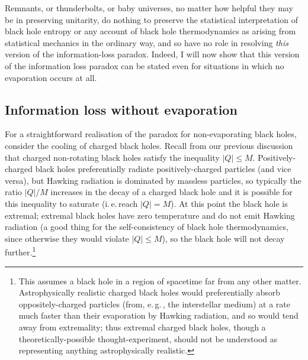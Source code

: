 \documentclass{article}
\newcommand{\iec}{\mbox{i.\,e.\,}}
\newcommand{\egc}{\mbox{e.\,g.\,}}
\begin{document}
Remnants, or thunderbolts,  or baby universes, no matter how helpful they may be in preserving unitarity, do nothing to preserve the statistical interpretation of black hole entropy or any account of black hole thermodynamics as arising from statistical mechanics in the ordinary way, and so have no role in resolving \emph{this} version of the information-loss paradox. Indeed, I will now show that this version of the information loss paradox can be stated even for situations in which no evaporation occurs at all.

\subsection{Information loss without evaporation}\label{infoparadox-noevap}

For a straightforward realisation of the paradox for non-evaporating black holes, consider the cooling of charged black holes. Recall from our previous discussion that charged non-rotating black holes satisfy the inequality $|Q|\leq M$. Positively-charged black holes preferentially radiate positively-charged particles (and vice versa), but Hawking radiation is dominated by massless particles, so typically the ratio $|Q|/M$ increases in the decay of a charged black hole and it is possible for this inequality to saturate (\iec reach $|Q|=M$). At this point the black hole is extremal; extremal black holes have zero temperature and do not emit Hawking radiation (a good thing for the self-consistency of black hole thermodynamics, since otherwise they would violate $|Q|\leq M$), so the black hole will not decay further.\footnote{This assumes a black hole in a region of spacetime far from any other matter. Astrophysically realistic charged black holes would preferentially absorb oppositely-charged particles (from, \egc, the interstellar medium) at a rate much faster than their evaporation by Hawking radiation, and so would tend away from extremality; thus extremal charged black holes, though a theoretically-possible thought-experiment, should not be understood as representing anything astrophysically realistic.}
\end{document}
